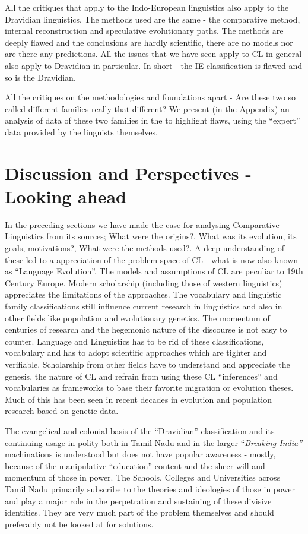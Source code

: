 All the critiques that apply to the Indo-European linguistics also apply to the Dravidian linguistics. The methods used are the same - the comparative method, internal reconstruction and speculative evolutionary paths. The methods are deeply flawed and the conclusions are hardly scientific, there are no models nor are there any predictions. All the issues that we have seen apply to CL in general also apply to Dravidian in particular. In short - the IE classification is flawed and so is the Dravidian.

All the critiques on the methodologies and foundations apart - Are these two so called different families really that different? We present (in the Appendix) an analysis of data of these two families in the to highlight flaws, using the “expert” data provided by the linguists themselves.


\vskip 2pt

\section*{Discussion and Perspectives - Looking ahead}

In the preceding sections we have made the case for analysing Comparative Linguistics from its sources; What were the origins?, What was its evolution, its goals, motivations?, What were the methods used?. A deep understanding of these led to a appreciation of the problem space of CL - what is now also known as “Language Evolution”. The models and assumptions of CL are peculiar to 19th Century Europe. Modern scholarship (including those of western linguistics) appreciates the limitations of the approaches. The vocabulary and linguistic family classifications still influence current research in linguistics and also in other fields like population and evolutionary genetics. The momentum of centuries of research and the hegemonic nature of the discourse is not easy to counter. Language and Linguistics has to be rid of these classifications, vocabulary and has to adopt scientific approaches which are tighter and verifiable. Scholarship from other fields have to understand and appreciate the genesis, the nature of CL and refrain from using these CL “inferences” and vocabularies as frameworks to base their favorite migration or evolution theses. Much of this has been seen in recent decades in evolution and population research based on genetic data.

The evangelical and colonial basis of the “Dravidian” classification and its continuing usage in polity both in Tamil Nadu and in the larger “\textit{Breaking India”} machinations is understood but does not have popular awareness - mostly, because of the manipulative “education” content and the sheer will and momentum of those in power. The Schools, Colleges and Universities across Tamil Nadu primarily subscribe to the theories and ideologies of those in power and play a major role in the perpetration and sustaining of these divisive identities. They are very much part of the problem themselves and should preferably not be looked at for solutions.


